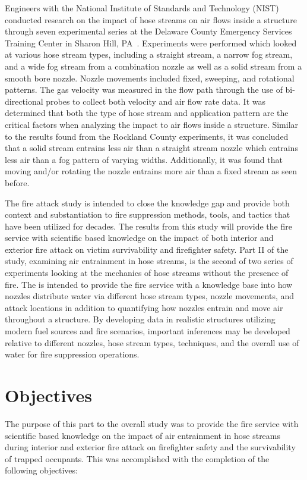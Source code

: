 \documentclass[12pt,oneside]{book}
\begin{document}
Engineers with the National Institute of Standards and Technology (NIST) conducted research on the impact of hose streams on air flows inside a structure through seven experimental series at the Delaware County Emergency Services Training Center in Sharon Hill, PA~\cite{NISTHoseStreams}. Experiments were performed which looked at various hose stream types, including a straight stream, a narrow fog stream, and a wide fog stream from a combination nozzle as well as a solid stream from a smooth bore nozzle. Nozzle movements included fixed, sweeping, and rotational patterns. The gas velocity was measured in the flow path through the use of bi-directional probes to collect both velocity and air flow rate data. It was determined that both the type of hose stream and application pattern are the critical factors when analyzing the impact to air flows inside a structure. Similar to the results found from the Rockland County experiments, it was concluded that a solid stream entrains less air than a straight stream nozzle which entrains less air than a fog pattern of varying widths. Additionally, it was found that moving and/or rotating the nozzle entrains more air than a fixed stream as seen before. 

The fire attack study is intended to close the knowledge gap and provide both context and substantiation to fire suppression methods, tools, and tactics that have been utilized for decades. The results from this study will provide the fire service with scientific based knowledge on the impact of both interior and exterior fire attack on victim survivability and firefighter safety. Part II of the study, examining air entrainment in hose streams, is the second of two series of experiments looking at the mechanics of hose streams without the presence of fire. The is intended to provide the fire service with a knowledge base into how nozzles distribute water via different hose stream types, nozzle movements, and attack locations in addition to quantifying how nozzles entrain and move air throughout a structure. By developing data in realistic structures utilizing modern fuel sources and fire scenarios, important inferences may be developed relative to different nozzles, hose stream types, techniques, and the overall use of water for fire suppression operations.

\chapter{Objectives}

The purpose of this part to the overall study was to provide the fire service with scientific based knowledge on the impact of air entrainment in hose streams during interior and exterior fire attack on firefighter safety and the survivability of trapped occupants. This was accomplished with the completion of the following objectives:
\end{document}
